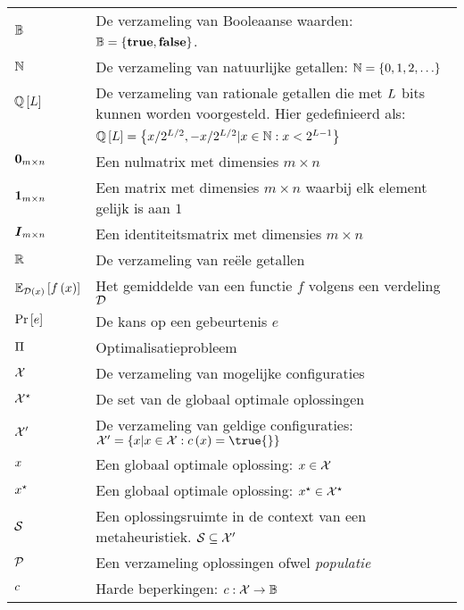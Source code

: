 \begin{flushleft}
  \renewcommand{\arraystretch}{1.1}
  \begin{tabularx}{\textwidth}{@{}p{20mm}X@{}}
    $\BoolSet$							& De verzameling van Booleaanse waarden: $\BoolSet=\accl{\mbox{\textbf{true}},\mbox{\textbf{false}}}$. \\
    $\NatSet$							& De verzameling van natuurlijke getallen: $\NatSet=\accl{0,1,2,\ldots}$ \\
    $\QbitSet{\bitvar}$					& De verzameling van rationale getallen die met $\bitvar$ bits kunnen worden voorgesteld. Hier gedefinieerd als:\\ &$\QbitSet{\bitvar}=\accl{x/2^{\bitvar/2},-x/2^{\bitvar/2}|x\in\NatSet:x<2^{\bitvar-1}}$ \\
    $\zeromatrix[m\times n]$			& Een nulmatrix met dimensies $m\times n$\\
    $\onematrix[m\times n]$				& Een matrix met dimensies $m\times n$ waarbij elk element gelijk is aan $1$\\
    $\identitymatrix[m\times n]$		& Een identiteitsmatrix met dimensies $m\times n$\\
    $\RealSet$							& De verzameling van re\"ele getallen\\
    $\mean[\fun{\calD}{x}]{\fun{f}{x}}$	& Het gemiddelde van een functie $f$ volgens een verdeling $\calD$\\
    $\Prob{e}$							& De kans op een gebeurtenis $e$\\
    $\OpProblem$						& Optimalisatieprobleem\\
    $\ConfigSet$						& De verzameling van mogelijke configuraties\\
    $\ConfigOpSet$						& De set van de globaal optimale oplossingen\\
    $\ConfigValSet$						& De verzameling van geldige configuraties: $\ConfigValSet=\accl{x|x\in\ConfigSet:\fun{c}{x}=\true{}}$\\
    $\sol$								& Een globaal optimale oplossing: $\sol\in\ConfigSet$\\
    $\bestSol$							& Een globaal optimale oplossing: $\xstar\in\ConfigOpSet$\\
    $\SolSet$							& Een oplossingsruimte in de context van een metaheuristiek. $\SolSet\subseteq\ConfigValSet$\\
    $\PopSet$							& Een verzameling oplossingen ofwel \emph{populatie}\\
    $\hcfun$							& Harde beperkingen: $\funsig{\hcfun}{\ConfigSet}{\BoolSet}$\\

\end{tabularx}
\end{flushleft}
